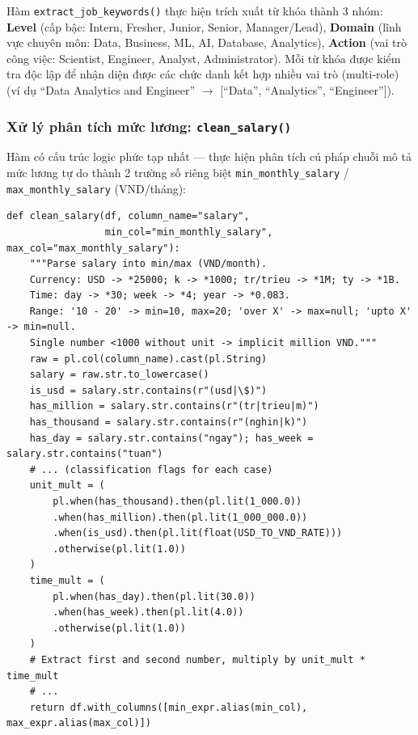 Hàm \texttt{extract\_job\_keywords()} thực hiện trích xuất từ khóa thành 3 nhóm: \textbf{Level} (cấp bậc: Intern,
Fresher, Junior, Senior, Manager/Lead), \textbf{Domain} (lĩnh vực chuyên môn: Data, Business,
ML, AI, Database, Analytics), \textbf{Action} (vai trò công việc: Scientist, Engineer,
Analyst, Administrator). Mỗi từ khóa được kiểm tra độc lập để nhận diện được các chức danh kết hợp nhiều vai trò (multi-role)
(ví dụ ``Data Analytics and Engineer'' $\to$ [``Data'', ``Analytics'',
``Engineer'']).

\subsubsection{Xử lý phân tích mức lương: \texttt{clean\_salary()}}

Hàm có cấu trúc logic phức tạp nhất — thực hiện phân tích cú pháp chuỗi mô tả mức lương tự do thành 2 trường số riêng biệt
\texttt{min\_monthly\_salary} / \texttt{max\_monthly\_salary} (VND/tháng):

\begin{lstlisting}[style=pystyle, caption={Xử lý phân tích lương: đơn vị + thời gian + khoảng lương}, label={lst:clean-salary}]
def clean_salary(df, column_name="salary",
                 min_col="min_monthly_salary", max_col="max_monthly_salary"):
    """Parse salary into min/max (VND/month).
    Currency: USD -> *25000; k -> *1000; tr/trieu -> *1M; ty -> *1B.
    Time: day -> *30; week -> *4; year -> *0.083.
    Range: '10 - 20' -> min=10, max=20; 'over X' -> max=null; 'upto X' -> min=null.
    Single number <1000 without unit -> implicit million VND."""
    raw = pl.col(column_name).cast(pl.String)
    salary = raw.str.to_lowercase()
    is_usd = salary.str.contains(r"(usd|\$)")
    has_million = salary.str.contains(r"(tr|trieu|m)")
    has_thousand = salary.str.contains(r"(nghin|k)")
    has_day = salary.str.contains("ngay"); has_week = salary.str.contains("tuan")
    # ... (classification flags for each case)
    unit_mult = (
        pl.when(has_thousand).then(pl.lit(1_000.0))
        .when(has_million).then(pl.lit(1_000_000.0))
        .when(is_usd).then(pl.lit(float(USD_TO_VND_RATE)))
        .otherwise(pl.lit(1.0))
    )
    time_mult = (
        pl.when(has_day).then(pl.lit(30.0))
        .when(has_week).then(pl.lit(4.0))
        .otherwise(pl.lit(1.0))
    )
    # Extract first and second number, multiply by unit_mult * time_mult
    # ...
    return df.with_columns([min_expr.alias(min_col), max_expr.alias(max_col)])
\end{lstlisting}

